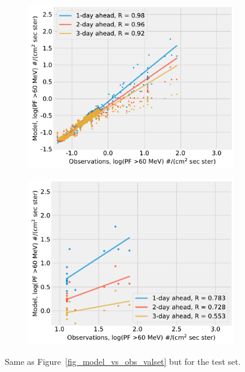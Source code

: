 \begin{figure}[htp]
\begin{subfigure}{0.4\textwidth}
         \centering
         \includegraphics[width=\textwidth]{chapter4/figs/scatterplot_obs_vs_model_tstset_3in1_log_PF60.pdf}
    \end{subfigure}
    \begin{subfigure}{0.4\textwidth}
         \centering
         \includegraphics[width=\textwidth]{chapter4/figs/scatterplot_obs_vs_model_tstset_3in1_LOG_PF_LT1_log_PF60.pdf}
    \end{subfigure}
\caption{Same as Figure~\ref{fig_model_vs_obs_valset} but for the test set.}
\label{fig_model_vs_obs_tstset}
\end{figure}

